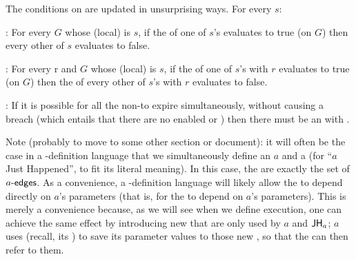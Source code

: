 \documentclass[12pt]{article}
\begin{document}
The conditions on \TGuards are updated in unsurprising ways. For every \State $s$:

\noindent {}: For every \GlobalState $G$ whose (local) \State is $s$, if the \TGuard of one of $s$'s \mustntrans evaluates to true (on $G$) then every other \TGuard of $s$ evaluates to false.
\medskip

\noindent {}: For every \Role r and \GlobalState $G$ whose (local) \State is $s$, if the \TGuard of one of $s$'s \rmustntrans with \Role $r$ evaluates to true (on $G$) then the \TGuard of every other of $s$'s \rmustntrans with \Role $r$ evaluates to false.
\medskip

\noindent {}: If it is possible for all the \enabled non-\Env \transitions to expire simultaneously, without causing a breach (which entails that there are no enabled \mustntrans or \rmustntrans) then there must be an \depTrans{\Env} with \Deadline \nodeadline.




\bigskip

Note (probably to move to some other section or document): it will often be the case in a \Contract-definition language that we simultaneously define an \Action $a$ and a \State {} (for ``$a$ Just Happened'', to fit its literal meaning). In this case, the  are exactly the set of $a\textsf{-edges}$. As a convenience, a \Contract-definition language will likely allow the  to depend directly on $a$'s parameters (that is, for the \TGuard
to depend on $a$'s parameters). This is merely a convenience because, as we will see when we define execution, one can achieve the same effect by introducing new \GVars that are only used by $a$ and $\textsf{JH}_{a}$; $a$ uses  (recall, its \gvTransform) to save its parameter values to those new \GVars, so that the  can then refer to them.
\end{document}
